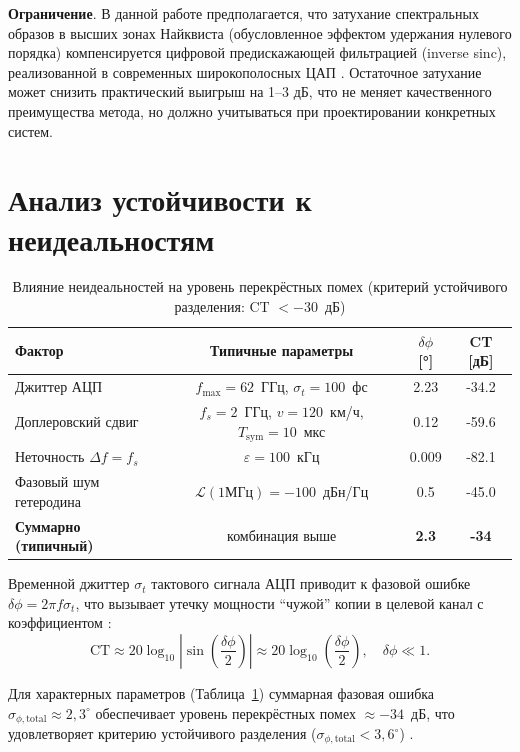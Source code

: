 \documentclass[a4paper,12pt]{article}
\numberwithin{equation}{section}
\begin{document}
\textbf{Ограничение}. В данной работе предполагается, что затухание спектральных образов 
в высших зонах Найквиста (обусловленное эффектом удержания нулевого порядка) 
компенсируется цифровой предискажающей фильтрацией (inverse sinc), 
реализованной в современных широкополосных ЦАП \cite{adi_ds,walden}. 
Остаточное затухание может снизить практический выигрыш на 1--3 дБ, 
что не меняет качественного преимущества метода, но должно учитываться 
при проектировании конкретных систем.

\section{Анализ устойчивости к неидеальностям}
\label{sec:analysis}

\begin{table}[htbp]
\centering
\caption{Влияние неидеальностей на уровень перекрёстных помех (критерий устойчивого разделения: CT $< -30$~дБ)}
\label{tab:nonidealities}
\begin{tabular}{lccc}
\toprule
\textbf{Фактор} & \textbf{Типичные параметры} & \textbf{$\delta\phi$ [°]} & \textbf{CT [дБ]} \\
\midrule
Джиттер АЦП & $f_\text{max}=62$~ГГц, $\sigma_t=100$~фс & 2.23 & -34.2 \\
Доплеровский сдвиг & $f_s=2$~ГГц, $v=120$~км/ч, $T_\text{sym}=10$~мкс & 0.12 & -59.6 \\
Неточность $\Delta f = f_s$ & $\varepsilon=100$~кГц & 0.009 & -82.1 \\
Фазовый шум гетеродина & $\mathcal{L}(1\text{МГц})=-100$~дБн/Гц & 0.5 & -45.0 \\
\midrule
\textbf{Суммарно (типичный)} & комбинация выше & \textbf{2.3} & \textbf{-34} \\
\bottomrule
\end{tabular}
\end{table}

Временной джиттер $\sigma_t$ тактового сигнала АЦП приводит к фазовой ошибке $\delta\phi = 2\pi f \sigma_t$, что вызывает утечку мощности ``чужой'' копии в целевой канал с коэффициентом \cite{adi_mt008}:
\begin{equation}
    \text{CT} \approx 20 \log_{10} \left| \sin\left(\frac{\delta\phi}{2}\right) \right| \approx 20 \log_{10}\left(\frac{\delta\phi}{2}\right), \quad \delta\phi \ll 1.
    \label{eq:crosstalk}
\end{equation}

Для характерных параметров (Таблица~\ref{tab:nonidealities}) суммарная фазовая ошибка $\sigma_{\phi,\text{total}} \approx 2{,}3^\circ$ обеспечивает уровень перекрёстных помех $\approx -34$~дБ, что удовлетворяет критерию устойчивого разделения ($\sigma_{\phi,\text{total}} < 3{,}6^\circ$) \cite{adi_mt008}.
\end{document}
